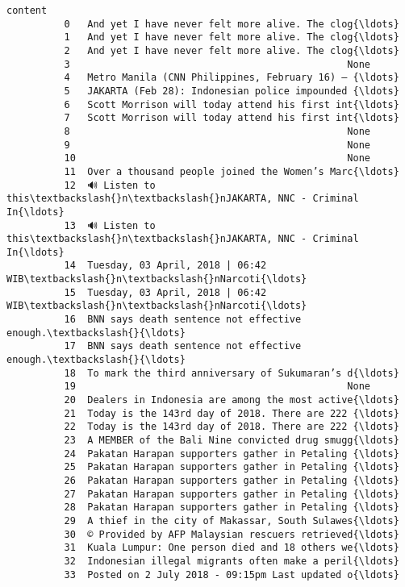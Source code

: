 \documentclass[11pt]{article}
\begin{document}
\begin{Verbatim}[commandchars=\\\{\}]
                                                        content  
          0   And yet I have never felt more alive. The clog{\ldots}  
          1   And yet I have never felt more alive. The clog{\ldots}  
          2   And yet I have never felt more alive. The clog{\ldots}  
          3                                                None  
          4   Metro Manila (CNN Philippines, February 16) — {\ldots}  
          5   JAKARTA (Feb 28): Indonesian police impounded {\ldots}  
          6   Scott Morrison will today attend his first int{\ldots}  
          7   Scott Morrison will today attend his first int{\ldots}  
          8                                                None  
          9                                                None  
          10                                               None  
          11  Over a thousand people joined the Women’s Marc{\ldots}  
          12  🔊 Listen to this\textbackslash{}n\textbackslash{}nJAKARTA, NNC - Criminal In{\ldots}  
          13  🔊 Listen to this\textbackslash{}n\textbackslash{}nJAKARTA, NNC - Criminal In{\ldots}  
          14  Tuesday, 03 April, 2018 | 06:42 WIB\textbackslash{}n\textbackslash{}nNarcoti{\ldots}  
          15  Tuesday, 03 April, 2018 | 06:42 WIB\textbackslash{}n\textbackslash{}nNarcoti{\ldots}  
          16  BNN says death sentence not effective enough.\textbackslash{}{\ldots}  
          17  BNN says death sentence not effective enough.\textbackslash{}{\ldots}  
          18  To mark the third anniversary of Sukumaran’s d{\ldots}  
          19                                               None  
          20  Dealers in Indonesia are among the most active{\ldots}  
          21  Today is the 143rd day of 2018. There are 222 {\ldots}  
          22  Today is the 143rd day of 2018. There are 222 {\ldots}  
          23  A MEMBER of the Bali Nine convicted drug smugg{\ldots}  
          24  Pakatan Harapan supporters gather in Petaling {\ldots}  
          25  Pakatan Harapan supporters gather in Petaling {\ldots}  
          26  Pakatan Harapan supporters gather in Petaling {\ldots}  
          27  Pakatan Harapan supporters gather in Petaling {\ldots}  
          28  Pakatan Harapan supporters gather in Petaling {\ldots}  
          29  A thief in the city of Makassar, South Sulawes{\ldots}  
          30  © Provided by AFP Malaysian rescuers retrieved{\ldots}  
          31  Kuala Lumpur: One person died and 18 others we{\ldots}  
          32  Indonesian illegal migrants often make a peril{\ldots}  
          33  Posted on 2 July 2018 - 09:15pm Last updated o{\ldots}  

\end{Verbatim}
\end{document}
